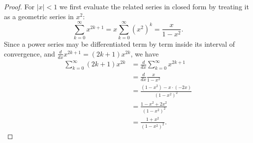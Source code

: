 \begin{proof}
  For $\lvert x \rvert < 1$ we first evaluate the related series in closed form
  by treating it as a geometric series in $x^2$:
  \[
    \sum_{k = 0}^\infty x^{2k + 1} = x \sum_{k = 0}^\infty {(x^2)}^k
    = \frac{x}{1 - x^2}.
  \]
  Since a power series may be differentiated term by term inside its interval of
  convergence, and $\frac{d}{dx} x^{2k + 1} = (2k + 1)x^{2k}$, we have
  \begin{equation*}
    \begin{split}
      \sum_{k = 0}^\infty (2k + 1)x^{2k}
      &= \frac{d}{dx} \sum_{k = 0}^\infty x^{2k + 1} \\
      &= \frac{d}{dx} \frac{x}{1 - x^2} \\
      &= \frac{(1 - x^2) - x \cdot (-2x)}{{(1 - x^2)}^2} \\
      &= \frac{1 - x^2 + 2x^2}{{(1 - x^2)}^2} \\
      &= \frac{1 + x^2}{{(1 - x^2)}^2}.
    \end{split}
  \end{equation*}
\end{proof}
